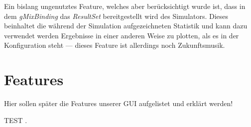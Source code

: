 \documentclass[a4paper, 11pt]{article} %
\begin{document}
Ein bislang ungenutztes Feature, welches aber berücksichtigt wurde ist, dass in dem \emph{gMixBinding} das \emph{ResultSet} bereitgestellt wird des Simulators. Dieses beinhaltet die während der Simulation aufgezeichneten Statistik und kann dazu verwendet werden Ergebnisse in einer anderen Weise zu plotten, als es in der Konfiguration steht --- dieses Feature ist allerdings noch Zukunftsmusik. 

\section{Features} %
\label{sec:features}
Hier sollen später die Features unserer GUI aufgelistet und erklärt werden!

TEST \cite{dummy:svs}.





\end{document}
